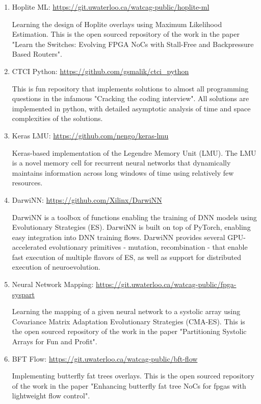 \begin{enumerate}
    \item Hoplite ML: \href{https://git.uwaterloo.ca/watcag-public/hoplite-ml}{https://git.uwaterloo.ca/watcag-public/hoplite-ml}
    
    Learning the design of Hoplite overlays using Maximum Likelihood Estimation. This is the open sourced repository of the work in the paper "Learn the Switches: Evolving FPGA NoCs with Stall-Free and Backpressure Based Routers".
    
    \item CTCI Python: \href{https://github.com/gsmalik/ctci_python}{https://github.com/gsmalik/ctci\_python}
    
    This is fun repository that implements solutions to almost all programming questions in the infamous "Cracking the coding interview". All solutions are implemented in python, with detailed asymptotic analysis of time and space complexities of the solutions.
    
    \item Keras LMU: \href{https://github.com/nengo/keras-lmu}{https://github.com/nengo/keras-lmu}
    
    Keras-based implementation of the Legendre Memory Unit (LMU). The LMU is a novel memory cell for recurrent neural networks that dynamically maintains information across long windows of time using relatively few resources.
    
    \item DarwiNN: \href{https://github.com/Xilinx/DarwiNN}{https://github.com/Xilinx/DarwiNN}
    
    DarwiNN is a toolbox of functions enabling the training of DNN models using Evolutionary Strategies (ES). DarwiNN is built on top of PyTorch, enabling easy integration into DNN training flows. DarwiNN provides several GPU-accelerated evolutionary primitives - mutation, recombination - that enable fast execution of multiple flavors of ES, as well as support for distributed execution of neuroevolution.
    
    \item Neural Network Mapping: \href{https://git.uwaterloo.ca/watcag-public/fpga-syspart}{https://git.uwaterloo.ca/watcag-public/fpga-syspart}
    
    Learning the mapping of a given neural network to a systolic array using Covariance Matrix Adaptation Evolutionary Strategies (CMA-ES). This is the open sourced repository of the work in the paper "Partitioning Systolic Arrays for Fun and Profit".
    
    \item BFT Flow: \href{https://git.uwaterloo.ca/watcag-public/bft-flow}{https://git.uwaterloo.ca/watcag-public/bft-flow}
    
    Implementing butterfly fat trees overlays. This is the open sourced repository of the work in the paper "Enhancing butterfly fat tree NoCs for fpgas with lightweight flow control".
\end{enumerate}

